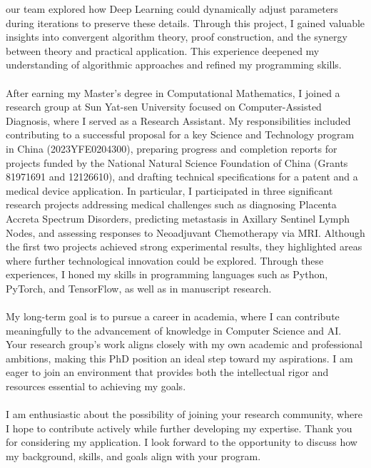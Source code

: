 \documentclass[11pt,a4paper, final]{moderncv}
\begin{document}
our team explored how Deep Learning could dynamically adjust parameters during iterations to preserve these details. 
Through this project, I gained valuable insights into convergent algorithm theory, 
proof construction, and the synergy between theory and practical application. 
This experience deepened my understanding of algorithmic approaches and refined my programming skills. 
\ \\
\ \\
After earning my Master's degree in Computational Mathematics, 
I joined a research group at Sun Yat-sen University focused on Computer-Assisted Diagnosis, 
where I served as a Research Assistant. 
My responsibilities included contributing to a successful proposal for 
a key Science and Technology program in China (2023YFE0204300), 
preparing progress and completion reports for projects funded by 
the National Natural Science Foundation of China (Grants 81971691 and 12126610), 
and drafting technical specifications for a patent and a medical device application. 
In particular, I participated in three significant research projects addressing medical challenges 
such as diagnosing Placenta Accreta Spectrum Disorders, 
predicting metastasis in Axillary Sentinel Lymph Nodes, and assessing responses to Neoadjuvant Chemotherapy via MRI. 
Although the first two projects achieved strong experimental results, 
they highlighted areas where further technological innovation could be explored. 
Through these experiences, I honed my skills in programming languages 
such as Python, PyTorch, and TensorFlow, as well as in manuscript research.
\ \\
\ \\
My long-term goal is to pursue a career in academia, 
where I can contribute meaningfully to the advancement of knowledge in Computer Science and AI. 
Your research group's work aligns closely with my own academic and professional ambitions, 
making this PhD position an ideal step toward my aspirations. 
I am eager to join an environment that provides both the intellectual rigor and resources essential to achieving my goals.
\ \\
\ \\
I am enthusiastic about the possibility of joining your research community, 
where I hope to contribute actively while further developing my expertise. 
Thank you for considering my application. 
I look forward to the opportunity to discuss how my background, skills, and goals align with your program.
\end{document}
